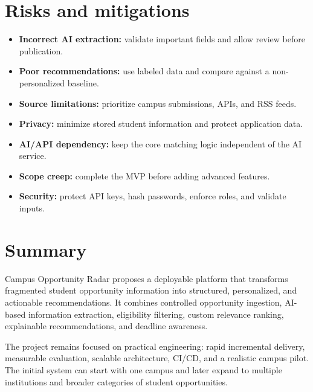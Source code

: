 \documentclass[11pt,a4paper]{article}
\begin{document}
\section{Risks and mitigations}

\begin{itemize}
\item \textbf{Incorrect AI extraction:} validate important fields and allow review before publication.
\item \textbf{Poor recommendations:} use labeled data and compare against a non-personalized baseline.
\item \textbf{Source limitations:} prioritize campus submissions, APIs, and RSS feeds.
\item \textbf{Privacy:} minimize stored student information and protect application data.
\item \textbf{AI/API dependency:} keep the core matching logic independent of the AI service.
\item \textbf{Scope creep:} complete the MVP before adding advanced features.
\item \textbf{Security:} protect API keys, hash passwords, enforce roles, and validate inputs.
\end{itemize}

\section{Summary}

Campus Opportunity Radar proposes a deployable platform that transforms fragmented student opportunity information into structured, personalized, and actionable recommendations. It combines controlled opportunity ingestion, AI-based information extraction, eligibility filtering, custom relevance ranking, explainable recommendations, and deadline awareness.

The project remains focused on practical engineering: rapid incremental delivery, measurable evaluation, scalable architecture, CI/CD, and a realistic campus pilot. The initial system can start with one campus and later expand to multiple institutions and broader categories of student opportunities.
\end{document}
